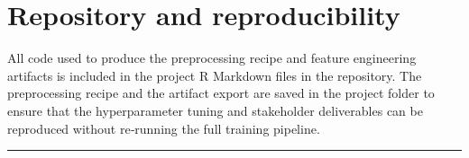 \documentclass[
  12pt,
]{article}
\begin{document}
\section{Repository and
reproducibility}\label{repository-and-reproducibility}

All code used to produce the preprocessing recipe and feature
engineering artifacts is included in the project R Markdown files in the
repository. The preprocessing recipe and the artifact export are saved
in the project folder to ensure that the hyperparameter tuning and
stakeholder deliverables can be reproduced without re‑running the full
training pipeline.

\begin{center}\rule{0.5\linewidth}{0.5pt}\end{center}
\end{document}
